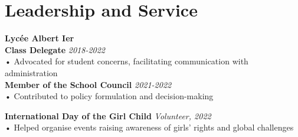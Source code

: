\documentclass[a4paper,10pt]{article}
\begin{document}
\section*{Leadership and Service}
\textbf{Lycée Albert Ier}\\
\textbf{Class Delegate} \hfill \textit{2018-2022}\\
• Advocated for student concerns, facilitating communication with administration\\
\textbf{Member of the School Council} \hfill \textit{2021-2022}\\
• Contributed to policy formulation and decision-making

\textbf{International Day of the Girl Child} \hfill \textit{Volunteer, 2022}\\
• Helped organise events raising awareness of girls’ rights and global challenges
\end{document}
